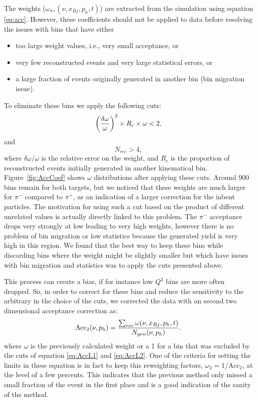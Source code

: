 The weights ($\omega_{\pi^\pm}(\nu,x_{Bj},p_h,t)$) are extracted from 
the simulation using equation \ref{eq:acc}. However, these coefficients should not be applied to data before resolving the issues with bins that have either
\begin{itemize}
 \item too large weight values, i.e., very small acceptance, or
 \item very few reconstructed events and very large statistical errors, or
 \item a large fraction of events originally generated in another bin (bin migration issue).
\end{itemize}
To eliminate these bins we apply the following cuts:
\begin{equation} \label{eq:AccL1}
\left ({\delta \omega \over \omega}\right ) ^2 \times R_c \times \omega < 2,
\end{equation}
and
\begin{equation} \label{eq:AccL2}
N_{rec} > 4,
\end{equation}
where $\delta \omega / \omega$ is the relative error on the weight, and $R_c$ is the 
proportion of reconstructed events initially generated in another kinematical bin. 
Figure~\ref{fig:AccCoef} shows $\omega$ distributions after applying these cuts. Around 
900 bins remain for both targets, but we noticed that these weights are much larger for 
$\pi^-$ compared to $\pi^+$, as an indication of a larger correction for the inbent 
particles. The motivation for using such a cut based on the product of different unrelated
values is actually directly linked to this problem. The $\pi^-$ acceptance drops very 
strongly at low \pt leading to very high weights, however there is no problem of bin migration
or low statistics because the generated yield is very high in this region. We found that 
the best way
to keep these bins while discarding bins where the weight might be slightly smaller but which 
have issues with bin migration and statistics was to apply the cuts presented above.

This process can create a bias, if for instance low $Q^2$ bins are more often dropped.
So, in order to correct for these bins and reduce the sensitivity to the arbitrary in
the choice of the cuts, we corrected the data with an second two dimensional 
acceptance correction as:
\begin{equation}
\text{Acc}_2(\nu,p_h) = {\sum_{rec} \omega (\nu,x_{Bj},p_h,t)\over N_{gen}(\nu,p_h)}.
\end{equation}
where $\omega$ is the previously calculated weight or a 1 for a bin that was excluded by the 
cuts of equation \ref{eq:AccL1} and \ref{eq:AccL2}. One of the criteria for setting the limits 
in these equation is in fact to keep this reweighting factors, $\omega_2 = 1/\text{Acc}_2$, at 
the level of a few percents. This indicates that the previous method only missed a small 
fraction of the event in the first place and is a good indication of the sanity of the method.

